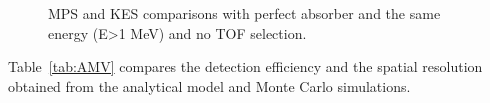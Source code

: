 \documentclass[a4paper,english,12pt]{article}
\begin{document}
\begin{figure}[!htp]
  \centering
  \quad
  \caption{\label{PGprofileFairComp} MPS and KES comparisons with perfect absorber and the same energy (E>1 MeV) and no TOF selection.}
\end{figure}  

Table~\ref{tab:AMV} compares the detection efficiency and the spatial resolution obtained from the analytical model and Monte Carlo simulations. 



\end{document}
